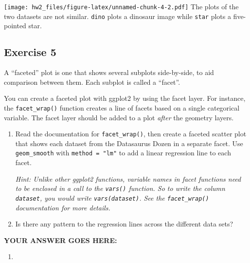 \documentclass[
]{article}
\newenvironment{Shaded}{\begin{snugshade}}{\end{snugshade}}
\newcommand{\DataTypeTok}[1]{\textcolor[rgb]{0.13,0.29,0.53}{#1}}
\newcommand{\KeywordTok}[1]{\textcolor[rgb]{0.13,0.29,0.53}{\textbf{#1}}}
\newcommand{\NormalTok}[1]{#1}
\newcommand{\OperatorTok}[1]{\textcolor[rgb]{0.81,0.36,0.00}{\textbf{#1}}}
\newcommand{\StringTok}[1]{\textcolor[rgb]{0.31,0.60,0.02}{#1}}
\providecommand{\tightlist}{%
  \setlength{\itemsep}{0pt}\setlength{\parskip}{0pt}}
\begin{document}
\texttt{[image: hw2\_files/figure-latex/unnamed-chunk-4-2.pdf]} The plots
of the two datasets are not similar. \texttt{dino} plots a dinosaur
image while \texttt{star} plots a five-pointed star.

\hypertarget{exercise-5}{%
\subsection{Exercise 5}\label{exercise-5}}

A ``faceted'' plot is one that shows several subplots side-by-side, to
aid comparison between them. Each subplot is called a ``facet''.

You can create a faceted plot with ggplot2 by using the facet layer. For
instance, the \texttt{facet\_wrap()} function creates a line of facets
based on a single categorical variable. The facet layer should be added
to a plot \emph{after} the geometry layers.

\begin{enumerate}
\def\labelenumi{\arabic{enumi}.}
\item
  Read the documentation for \texttt{facet\_wrap()}, then create a
  faceted scatter plot that shows each dataset from the Datasaurus Dozen
  in a separate facet. Use \texttt{geom\_smooth} with
  \texttt{method\ =\ "lm"} to add a linear regression line to each
  facet.

  \emph{Hint: Unlike other ggplot2 functions, variable names in facet
  functions need to be enclosed in a call to the \texttt{vars()}
  function. So to write the column \texttt{dataset}, you would write
  \texttt{vars(dataset)}. See the \texttt{facet\_wrap()} documentation
  for more details.}
\item
  Is there any pattern to the regression lines across the different data
  sets?
\end{enumerate}

\textbf{YOUR ANSWER GOES HERE:}

\begin{enumerate}
\def\labelenumi{\arabic{enumi}.}
\tightlist
\item
\end{enumerate}

\begin{Shaded}
\end{Shaded}
\end{document}
